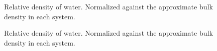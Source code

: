 
\begin{figure}[!p]%
    \centering%
    \caption{%
        Relative density of water. Normalized against the approximate bulk density in each system. %
        \label{fig:density_regular_and_wide}%
    }%
\end{figure}%

\begin{figure}[!p]%
    \centering%
    \caption{%
        Relative density of water. Normalized against the approximate bulk density in each system. %
        \label{fig:density_flat_and_wide}%
    }%
\end{figure}%


